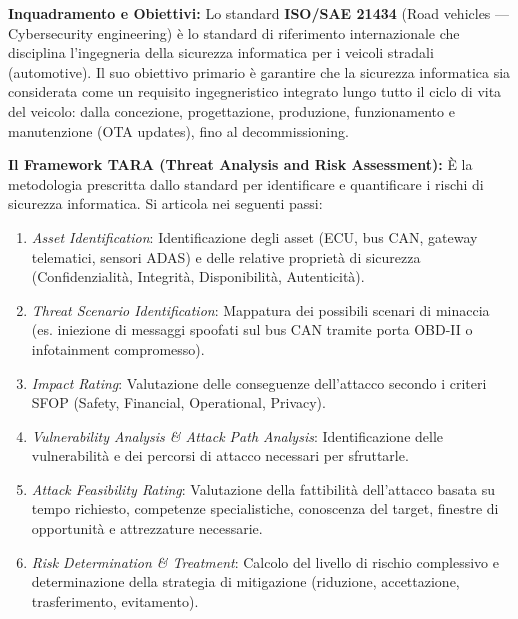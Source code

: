 \documentclass[11pt,a4paper]{article}
\begin{document}
\begin{solutionbox}
\textbf{Inquadramento e Obiettivi:}
Lo standard \textbf{ISO/SAE 21434} (Road vehicles --- Cybersecurity engineering) \`e lo standard di riferimento internazionale che disciplina l'ingegneria della sicurezza informatica per i veicoli stradali (automotive). Il suo obiettivo primario \`e garantire che la sicurezza informatica sia considerata come un requisito ingegneristico integrato lungo tutto il ciclo di vita del veicolo: dalla concezione, progettazione, produzione, funzionamento e manutenzione (OTA updates), fino al decommissioning.

\textbf{Il Framework TARA (Threat Analysis and Risk Assessment):}
\`E la metodologia prescritta dallo standard per identificare e quantificare i rischi di sicurezza informatica. Si articola nei seguenti passi:
\begin{enumerate}
    \item \textit{Asset Identification}: Identificazione degli asset (ECU, bus CAN, gateway telematici, sensori ADAS) e delle relative propriet\`a di sicurezza (Confidenzialit\`a, Integrit\`a, Disponibilit\`a, Autenticit\`a).
    \item \textit{Threat Scenario Identification}: Mappatura dei possibili scenari di minaccia (es. iniezione di messaggi spoofati sul bus CAN tramite porta OBD-II o infotainment compromesso).
    \item \textit{Impact Rating}: Valutazione delle conseguenze dell'attacco secondo i criteri SFOP (Safety, Financial, Operational, Privacy).
    \item \textit{Vulnerability Analysis \& Attack Path Analysis}: Identificazione delle vulnerabilit\`a e dei percorsi di attacco necessari per sfruttarle.
    \item \textit{Attack Feasibility Rating}: Valutazione della fattibilit\`a dell'attacco basata su tempo richiesto, competenze specialistiche, conoscenza del target, finestre di opportunit\`a e attrezzature necessarie.
    \item \textit{Risk Determination \& Treatment}: Calcolo del livello di rischio complessivo e determinazione della strategia di mitigazione (riduzione, accettazione, trasferimento, evitamento).
\end{enumerate}
\end{solutionbox}
\end{document}
